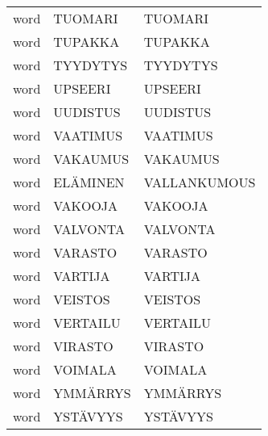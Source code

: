 \begin{supertabular}{lll}
 word &   TUOMARI &        TUOMARI \\
 word &   TUPAKKA &        TUPAKKA \\
 word &  TYYDYTYS &       TYYDYTYS \\
 word &   UPSEERI &        UPSEERI \\
 word &  UUDISTUS &       UUDISTUS \\
 word &  VAATIMUS &       VAATIMUS \\
 word &  VAKAUMUS &       VAKAUMUS \\
 word &  ELÄMINEN &   VALLANKUMOUS \\
 word &   VAKOOJA &        VAKOOJA \\
 word &  VALVONTA &       VALVONTA \\
 word &   VARASTO &        VARASTO \\
 word &   VARTIJA &        VARTIJA \\
 word &   VEISTOS &        VEISTOS \\
 word &  VERTAILU &       VERTAILU \\
 word &   VIRASTO &        VIRASTO \\
 word &   VOIMALA &        VOIMALA \\
 word &  YMMÄRRYS &       YMMÄRRYS \\
 word &  YSTÄVYYS &       YSTÄVYYS \\
\end{supertabular}
